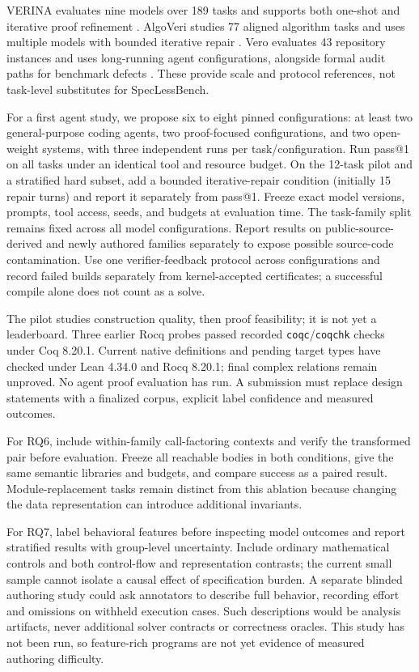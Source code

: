 \documentclass{article}
\begin{document}
VERINA evaluates nine models over 189 tasks and supports both one-shot and iterative proof refinement \citep{ye2026verina}. AlgoVeri studies 77 aligned algorithm tasks and uses multiple models with bounded iterative repair \citep{zhao2026algoveri}. Vero evaluates 43 repository instances and uses long-running agent configurations, alongside formal audit paths for benchmark defects \citep{ye2026vero}. These provide scale and protocol references, not task-level substitutes for SpecLessBench.

For a first agent study, we propose six to eight pinned configurations: at least two general-purpose coding agents, two proof-focused configurations, and two open-weight systems, with three independent runs per task/configuration. Run pass@1 on all tasks under an identical tool and resource budget. On the 12-task pilot and a stratified hard subset, add a bounded iterative-repair condition (initially 15 repair turns) and report it separately from pass@1. Freeze exact model versions, prompts, tool access, seeds, and budgets at evaluation time. The task-family split remains fixed across all model configurations. Report results on public-source-derived and newly authored families separately to expose possible source-code contamination. Use one verifier-feedback protocol across configurations and record failed builds separately from kernel-accepted certificates; a successful compile alone does not count as a solve.

The pilot studies construction quality, then proof feasibility; it is not yet a leaderboard. Three earlier Rocq probes passed recorded \texttt{coqc}/\texttt{coqchk} checks under Coq 8.20.1. Current native definitions and pending target types have checked under Lean 4.34.0 and Rocq 8.20.1; final complex relations remain unproved. No agent proof evaluation has run. A submission must replace design statements with a finalized corpus, explicit label confidence and measured outcomes.

For RQ6, include within-family call-factoring contexts and verify the transformed pair before evaluation. Freeze all reachable bodies in both conditions, give the same semantic libraries and budgets, and compare success as a paired result. Module-replacement tasks remain distinct from this ablation because changing the data representation can introduce additional invariants.

For RQ7, label behavioral features before inspecting model outcomes and report stratified results with group-level uncertainty. Include ordinary mathematical controls and both control-flow and representation contrasts; the current small sample cannot isolate a causal effect of specification burden. A separate blinded authoring study could ask annotators to describe full behavior, recording effort and omissions on withheld execution cases. Such descriptions would be analysis artifacts, never additional solver contracts or correctness oracles. This study has not been run, so feature-rich programs are not yet evidence of measured authoring difficulty.
\end{document}
